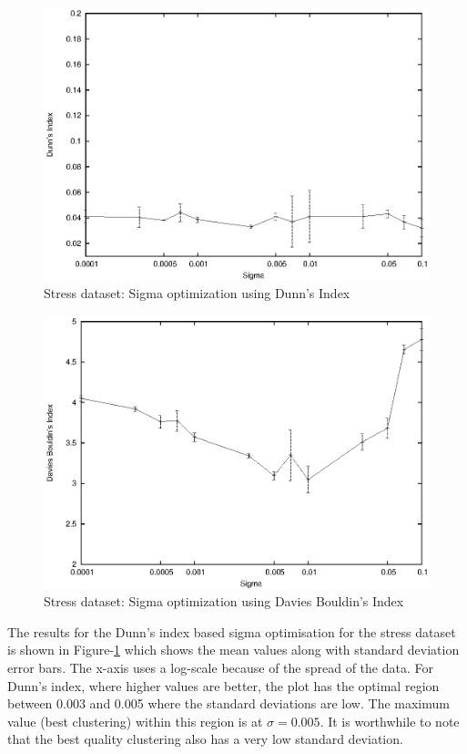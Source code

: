 \begin{figure}[p]
 \centering
 \includegraphics[scale=1.0]{images_only/semisup/results/plots/stress_dunn.eps}
 \caption{Stress dataset: Sigma optimization using Dunn's Index}
 \label{fig:stress_sigma_opt_dunn}
\end{figure}

\begin{figure}[p]
 \centering
 \includegraphics[scale=1.0]{images_only/semisup/results/plots/stress_davies.eps}
 \caption{Stress dataset: Sigma optimization using Davies Bouldin's Index}
 \label{fig:stress_sigma_opt_dav}
\end{figure}

The results for the Dunn's index based sigma optimisation for the stress dataset is shown in Figure-\ref{fig:stress_sigma_opt_dunn} which shows the mean values along with standard deviation error bars. 
The x-axis uses a log-scale because of the spread of the data.  For Dunn's index, where higher values are better, the plot has the optimal region between 0.003 and 0.005 where the 
standard deviations are low.
The maximum value (best clustering) within this region is at $\sigma=0.005$. It is worthwhile to note that the best quality 
clustering also has a very low standard deviation.

